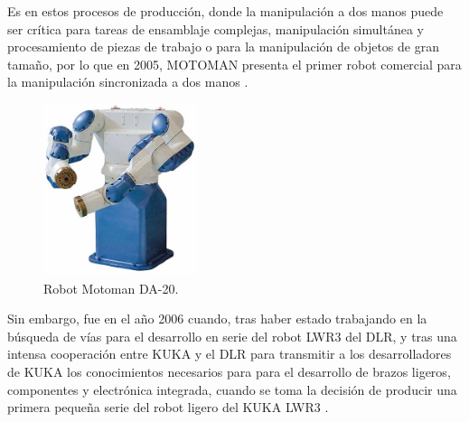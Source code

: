 \begin{itemize}
  Es en estos procesos de producción, donde la manipulación a dos manos puede ser crítica para tareas de ensamblaje complejas, manipulación simultánea
y procesamiento de piezas de trabajo o para la manipulación de objetos de gran tamaño, por lo que en 2005, MOTOMAN presenta el primer robot comercial para la manipulación sincronizada a dos manos \cite{Siciliano16}.

  \begin{figure} [h!]
    \begin{center}
      \includegraphics[width=45mm]{figs/MOTOMAN.jpg}
    \end{center}
    \caption{Robot Motoman DA-20.}
    \label{fig:MOTOMAN}
  \end{figure}
  
  Sin embargo, fue en el año 2006 cuando, tras haber estado trabajando en la búsqueda de vías para el desarrollo en serie del robot LWR3 del DLR, y tras una intensa cooperación entre KUKA y el DLR para transmitir a los desarrolladores de KUKA los conocimientos necesarios para para el desarrollo de brazos ligeros, componentes y electrónica integrada, cuando se toma la decisión de producir una primera pequeña serie del robot ligero del KUKA LWR3 \cite{Bischoff10}.
  

\end{itemize}
